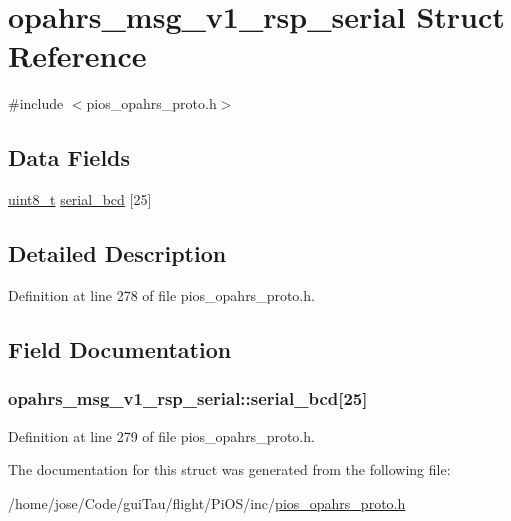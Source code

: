 \hypertarget{structopahrs__msg__v1__rsp__serial}{\section{opahrs\-\_\-msg\-\_\-v1\-\_\-rsp\-\_\-serial Struct Reference}
\label{structopahrs__msg__v1__rsp__serial}
}


{\ttfamily \#include $<$pios\-\_\-opahrs\-\_\-proto.\-h$>$}

\subsection*{Data Fields}
\begin{DoxyCompactItemize}
\item 
\hyperlink{stdint_8h_aba7bc1797add20fe3efdf37ced1182c5}{uint8\-\_\-t} \hyperlink{structopahrs__msg__v1__rsp__serial_a56e28bfb35c07c1c3cc15e22ded62a6a}{serial\-\_\-bcd} \mbox{[}25\mbox{]}
\end{DoxyCompactItemize}


\subsection{Detailed Description}


Definition at line 278 of file pios\-\_\-opahrs\-\_\-proto.\-h.



\subsection{Field Documentation}
\hypertarget{structopahrs__msg__v1__rsp__serial_a56e28bfb35c07c1c3cc15e22ded62a6a}{
\subsubsection[{serial\-\_\-bcd}]{ opahrs\-\_\-msg\-\_\-v1\-\_\-rsp\-\_\-serial\-::serial\-\_\-bcd\mbox{[}25\mbox{]}}}\label{structopahrs__msg__v1__rsp__serial_a56e28bfb35c07c1c3cc15e22ded62a6a}


Definition at line 279 of file pios\-\_\-opahrs\-\_\-proto.\-h.



The documentation for this struct was generated from the following file\-:\begin{DoxyCompactItemize}
\item 
/home/jose/\-Code/gui\-Tau/flight/\-Pi\-O\-S/inc/\hyperlink{pios__opahrs__proto_8h}{pios\-\_\-opahrs\-\_\-proto.\-h}\end{DoxyCompactItemize}
